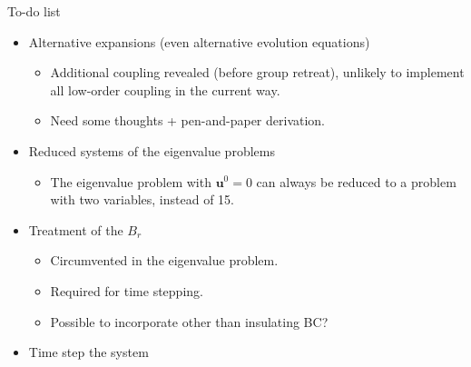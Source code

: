 \documentclass[11pt,aspectratio=169]{beamer}
\begin{document}
\begin{frame}{To-do list}
	\begin{itemize}
		\item Alternative expansions (even alternative evolution equations)
		\begin{itemize}
			\item Additional coupling revealed (before group retreat), unlikely to implement all low-order coupling in the current way.
			\item Need some thoughts + pen-and-paper derivation.
		\end{itemize}
		\item Reduced systems of the eigenvalue problems
		\begin{itemize}
			\item The eigenvalue problem with $\mathbf{u}^0 = 0$ can always be reduced to a problem with two variables, instead of 15.
		\end{itemize}
		\item Treatment of the $B_r$
		\begin{itemize}
			\item Circumvented in the eigenvalue problem.
			\item Required for time stepping.
			\item Possible to incorporate other than insulating BC?
		\end{itemize}
		\item Time step the system
	\end{itemize}
\end{frame}
\end{document}
